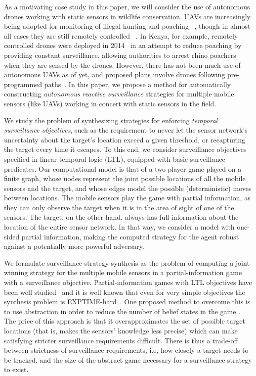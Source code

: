 As a motivating case study in this paper, we will consider the use of autonomous drones working with static sensors in wildlife conservation. UAVs are increasingly being adopted for monitoring of illegal hunting and poaching ~\cite{schiffman2014drones}, though in almost all cases they are still remotely controlled ~\cite{mulero2014remotely}. In Kenya, for example, remotely controlled drones were deployed in 2014~\cite{Kenya} in an attempt to reduce poaching  by providing constant surveillance, allowing authorities to arrest rhino poachers when they are sensed by the drones. However, there has not been much use of autonomous UAVs as of yet, and proposed plans involve drones following pre-programmed paths~\cite{Koh12}. In this paper, we propose a method for automatically constructing  \emph{autonomous reactive surveillance} strategies for multiple mobile sensors (like UAVs) working in concert with static sensors in the field. 

We study the problem of synthesizing strategies for enforcing \emph{temporal surveillance objectives}, such as the requirement to never let the sensor network's uncertainty about the target's location exceed a given threshold, or recapturing the target every time it escapes. To this end, we consider surveillance objectives specified in linear temporal logic (LTL), equipped with basic surveillance predicates. Our computational model is that of a two-player game played on a finite graph, whose nodes represent the joint possible locations of all the mobile sensors and the target, and whose edges model the possible (deterministic) moves between locations. The mobile sensors play the game with partial information, as they can only observe the target when  it is in the area of sight of one of the sensors. The target, on the other hand, always has full information about the location of the entire sensor network. In that way, we consider a model with one-sided partial information, making the computed strategy for the agent robust against a potentially more powerful adversary. 

We formulate surveillance strategy synthesis as the problem of computing a joint winning strategy for the multiple mobile sensors in a partial-information game with a surveillance objective. Partial-information games with LTL objectives have been well studied~\cite{DoyenR11,Chatterjee2013} and it is well known that even for very simple objectives the synthesis problem is EXPTIME-hard~\cite{Reif84,BerwangerD08}. One proposed method to overcome this is to use abstraction in order to reduce the number of belief states in the game \cite{Bhar16}. The price of this approach is that it overapproximates the set of possible target locations (that is, makes the sensors' knowledge less precise) which can make satisfying stricter surveillance requirements difficult. There is thus a trade-off between strictness of surveillance requirements, i.e, how closely a target needs to be tracked, and the size of the abstract game necessary for a surveillance strategy to exist. 

